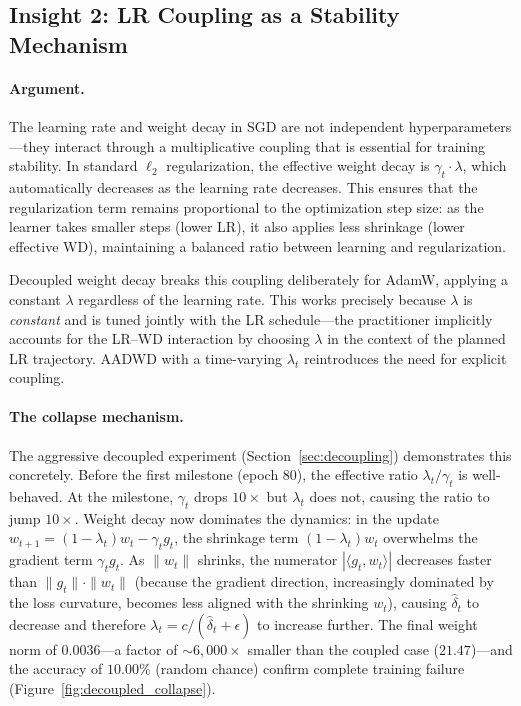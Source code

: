 \documentclass{article}
\begin{document}
\subsection{Insight 2: LR Coupling as a Stability Mechanism}

\paragraph{Argument.}
The learning rate and weight decay in SGD are not independent hyperparameters---they
interact through a multiplicative coupling that is essential for training stability.
In standard $\ell_2$ regularization, the effective weight decay is
$\gamma_t \cdot \lambda$, which automatically decreases as the learning rate
decreases.
This ensures that the regularization term remains proportional to the optimization
step size: as the learner takes smaller steps (lower LR), it also applies less
shrinkage (lower effective WD), maintaining a balanced ratio between learning and
regularization.

Decoupled weight decay \citep{loshchilov2019decoupled} breaks this coupling
deliberately for AdamW, applying a constant $\lambda$ regardless of the learning
rate.
This works precisely because $\lambda$ is \emph{constant} and is tuned jointly with
the LR schedule---the practitioner implicitly accounts for the LR--WD interaction by
choosing $\lambda$ in the context of the planned LR trajectory.
AADWD with a time-varying $\lambda_t$ reintroduces the need for explicit coupling.

\paragraph{The collapse mechanism.}
The aggressive decoupled experiment (Section~\ref{sec:decoupling}) demonstrates this
concretely.
Before the first milestone (epoch 80), the effective ratio $\lambda_t / \gamma_t$ is
well-behaved.
At the milestone, $\gamma_t$ drops $10\times$ but $\lambda_t$ does not, causing the
ratio to jump $10\times$.
Weight decay now dominates the dynamics: in the update
$w_{t+1} = (1 - \lambda_t) w_t - \gamma_t g_t$, the shrinkage term
$(1 - \lambda_t) w_t$ overwhelms the gradient term $\gamma_t g_t$.
As $\|w_t\|$ shrinks, the numerator $|\langle g_t, w_t \rangle|$ decreases faster
than $\|g_t\| \cdot \|w_t\|$ (because the gradient direction, increasingly dominated
by the loss curvature, becomes less aligned with the shrinking $w_t$), causing
$\hat{\delta}_t$ to decrease and therefore
$\lambda_t = c / (\hat{\delta}_t + \epsilon)$ to increase further.
The final weight norm of $0.0036$---a factor of $\sim 6{,}000\times$ smaller than
the coupled case ($21.47$)---and the accuracy of $10.00\%$ (random chance) confirm
complete training failure (Figure~\ref{fig:decoupled_collapse}).
\end{document}
